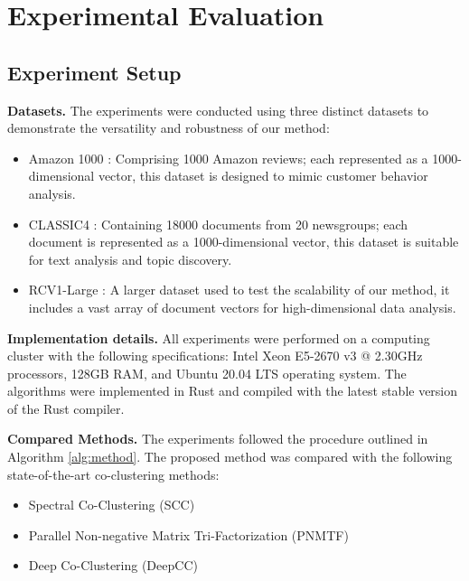
\section{Experimental Evaluation}
\label{sec:experiment}
\subsection{Experiment Setup}

\textbf{Datasets.}
The experiments were conducted using three distinct datasets to demonstrate the versatility and robustness of our method:

\begin{itemize}
    \item Amazon 1000 \cite{ni2019justifying}: Comprising 1000 Amazon reviews; each represented as a 1000-dimensional vector, this dataset is designed to mimic customer behavior analysis.
    \item CLASSIC4 \cite{reddy2021weclustering}: Containing 18000 documents from 20 newsgroups; each document is represented as a 1000-dimensional vector, this dataset is suitable for text analysis and topic discovery.
    \item RCV1-Large \cite{lewis2004rcv1}: A larger dataset used to test the scalability of our method, it includes a vast array of document vectors for high-dimensional data analysis.
\end{itemize}

\textbf{Implementation details.}
All experiments were performed on a computing cluster with the following specifications: Intel Xeon E5-2670 v3 @ 2.30GHz processors, 128GB RAM, and Ubuntu 20.04 LTS operating system. The algorithms were implemented in Rust and compiled with the latest stable version of the Rust compiler.

\textbf{Compared Methods.}
The experiments followed the procedure outlined in Algorithm \ref{alg:method}. The proposed method was compared with the following state-of-the-art co-clustering methods:

\begin{itemize}
    \item Spectral Co-Clustering (SCC) \cite{dhillon2001CoclusteringDocumentsWords}
    \item Parallel Non-negative Matrix Tri-Factorization (PNMTF)\cite{chen2023ParallelNonNegativeMatrix}
    \item Deep Co-Clustering (DeepCC) \cite{dongkuanxu2019DeepCoClustering}
\end{itemize}

